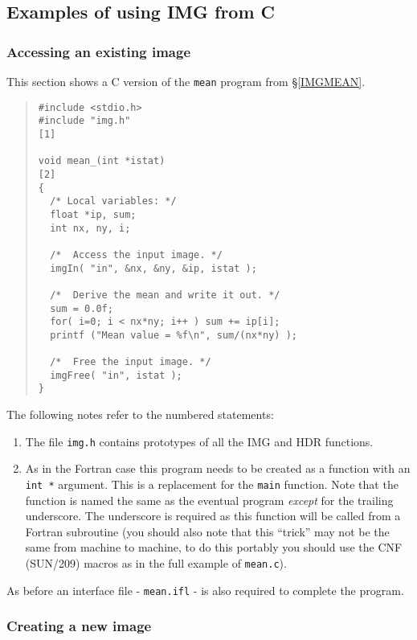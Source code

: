 \documentclass[twoside,11pt]{article}
\newcommand{\htmladdnormallink}[2]{#1}
\newcommand{\hyperref}[4]{#2\ref{#4}#3}
\newcommand{\xref}[3]{#1}
\renewcommand{\_}{\texttt{\symbol{95}}}
\newcommand{\myverb}[1]{{\texttt{#1}}}
\newcommand{\mynote}{The following notes refer to the numbered statements:}
\newenvironment{code}{\begin{small} \begin{quote}}
                     {\end{quote} \end{small}}
\newenvironment{enumnotes}
{
   \renewcommand{\labelenumi}{\myverb{[\theenumi]}}
   \begin{enumerate}
}{
   \end{enumerate}
   \renewcommand{\labelenumi}{\theenumi}
}
\renewenvironment{enumnotes}
  {
    \begin{enumerate}
  }{
    \end{enumerate}
  }
\begin{document}
\subsection{Examples of using IMG from C}
\subsubsection{Accessing an existing image}
This section shows a C version of the \myverb{mean} program from
\hyperref{elsewhere}{\S}{}{IMGMEAN}.
\begin{code}
\begin{verbatim}
#include <stdio.h>
#include "img.h"                                              [1]

void mean_(int *istat)                                        [2]
{
  /* Local variables: */
  float *ip, sum;
  int nx, ny, i;

  /*  Access the input image. */
  imgIn( "in", &nx, &ny, &ip, istat );

  /*  Derive the mean and write it out. */
  sum = 0.0f;
  for( i=0; i < nx*ny; i++ ) sum += ip[i];
  printf ("Mean value = %f\n", sum/(nx*ny) );

  /*  Free the input image. */
  imgFree( "in", istat );
}
\end{verbatim}
\end{code}

\mynote

\begin{enumnotes}
\item The file \myverb{img.h} contains prototypes of all the IMG
and HDR functions.
\item As in the Fortran case this program needs to be created as a
function with an \myverb{int *} argument. This is a replacement for
the \myverb{main} function. Note that the function is named the same
as the eventual program {\em except} for the trailing underscore. The
underscore is required as this function will be called from a Fortran
subroutine (you should also note that this ``trick'' may not be the
same from machine to machine, to do this portably you should use the
\xref{CNF}{sun209}{} (SUN/209) macros as in the full example of
\htmladdnormallink{\myverb{mean.c}}{../../bin/examples/img/mean.c}).
\end{enumnotes}

As before an interface file -
\htmladdnormallink{\myverb{mean.ifl}}{../../bin/examples/img/mean.ifl}
- is also required to complete the program.

\subsubsection{Creating a new image}
\end{document}
